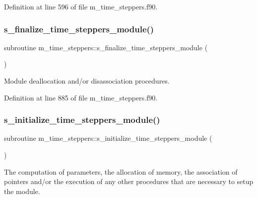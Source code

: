 Definition at line 596 of file m\+\_\+time\+\_\+steppers.\+f90.

\mbox{\label{namespacem__time__steppers_aa065ccea3fd76bafc98da7cea5d50416}} 
\subsubsection{\texorpdfstring{s\+\_\+finalize\+\_\+time\+\_\+steppers\+\_\+module()}{s\_finalize\_time\_steppers\_module()}}
{\footnotesize\ttfamily subroutine m\+\_\+time\+\_\+steppers\+::s\+\_\+finalize\+\_\+time\+\_\+steppers\+\_\+module (\begin{DoxyParamCaption}{ }\end{DoxyParamCaption})}



Module deallocation and/or disassociation procedures. 



Definition at line 885 of file m\+\_\+time\+\_\+steppers.\+f90.

\mbox{\label{namespacem__time__steppers_a9287671ffb47dce60f906e5d885fb96f}} 
\subsubsection{\texorpdfstring{s\+\_\+initialize\+\_\+time\+\_\+steppers\+\_\+module()}{s\_initialize\_time\_steppers\_module()}}
{\footnotesize\ttfamily subroutine m\+\_\+time\+\_\+steppers\+::s\+\_\+initialize\+\_\+time\+\_\+steppers\+\_\+module (\begin{DoxyParamCaption}{ }\end{DoxyParamCaption})}



The computation of parameters, the allocation of memory, the association of pointers and/or the execution of any other procedures that are necessary to setup the module. 



